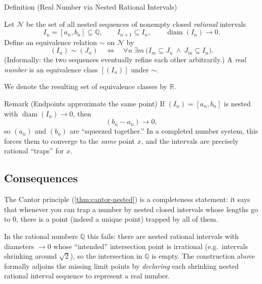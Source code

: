 \begin{definitionbox}{Definition (Real Number via Nested Rational Intervals)}
\begin{definition}\label{def:real-as-nested}
Let $\mathcal{N}$ be the set of all nested sequences of nonempty closed
\emph{rational} intervals
\[
I_n=[a_n,b_n]\subseteq \mathbb{Q},
\qquad I_{n+1}\subseteq I_n,
\qquad \operatorname{diam}(I_n)\to 0.
\]
Define an equivalence relation $\sim$ on $\mathcal{N}$ by
\[
(I_n)\sim(J_n)
\quad\Longleftrightarrow\quad
\forall n\ \exists m\ \bigl(I_m\subseteq J_n \ \wedge\  J_m\subseteq I_n\bigr).
\]
(Informally: the two sequences eventually refine each other arbitrarily.)
A \emph{real number} is an equivalence class $[(I_n)]$ under $\sim$.

We denote the resulting set of equivalence classes by $\mathbb{R}$.
\end{definition}
\end{definitionbox}

\begin{propositionbox}{Remark (Endpoints approximate the same point)}
If $(I_n)=[a_n,b_n]$ is nested with $\operatorname{diam}(I_n)\to 0$, then
\[
(b_n-a_n)\to 0,
\]
so $(a_n)$ and $(b_n)$ are ``squeezed together.'' In a completed number system,
this forces them to converge to the \emph{same} point $x$, and the intervals
are precisely rational ``traps'' for $x$.
\end{propositionbox}


\subsection*{Consequences}

\begin{remark*}
The Cantor principle (\autoref{thm:cantor-nested}) is a completeness statement:
it says that whenever you can trap a number by nested closed intervals whose
lengths go to $0$, there is a point (indeed a unique point) trapped by all of them.

In the rational numbers $\mathbb{Q}$ this fails: there are nested rational
intervals with diameters $\to 0$ whose ``intended'' intersection point is
irrational (e.g.\ intervals shrinking around $\sqrt{2}$), so the intersection
in $\mathbb{Q}$ is empty. The construction above formally adjoins the missing
limit points by \emph{declaring} each shrinking nested rational interval
sequence to represent a real number.
\end{remark*}

